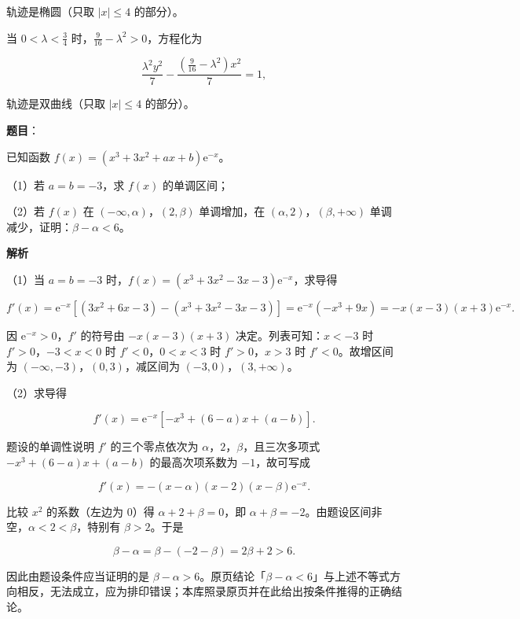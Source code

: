 \begin{answer}
轨迹是椭圆（只取 $|x|\leqslant4$ 的部分）。

当 $0<\lambda<\frac34$ 时，$\frac9{16}-\lambda^2>0$，方程化为

\nopagebreak[4]
\[\frac{\lambda^2y^2}{7}-\frac{\left(\frac9{16}-\lambda^2\right)x^2}{7}=1,\]

轨迹是双曲线（只取 $|x|\leqslant4$ 的部分）。


\end{answer}
\begin{answer}

\textbf{题目}：

已知函数 $f(x)=(x^3+3x^2+ax+b)\mathrm e^{-x}$。

（1）若 $a=b=-3$，求 $f(x)$ 的单调区间；

（2）若 $f(x)$ 在 $(-\infty,\alpha)$，$(2,\beta)$ 单调增加，在 $(\alpha,2)$，$(\beta,+\infty)$ 单调减少，证明：$\beta-\alpha<6$。

\textbf{解析}

（1）当 $a=b=-3$ 时，$f(x)=(x^3+3x^2-3x-3)\mathrm e^{-x}$，求导得

\nopagebreak[4]
\[f'(x)=\mathrm e^{-x}\left[(3x^2+6x-3)-(x^3+3x^2-3x-3)\right]
=\mathrm e^{-x}(-x^3+9x)=-x(x-3)(x+3)\mathrm e^{-x}.\]

因 $\mathrm e^{-x}>0$，$f'$ 的符号由 $-x(x-3)(x+3)$ 决定。列表可知：$x<-3$ 时 $f'>0$，$-3<x<0$ 时 $f'<0$，$0<x<3$ 时 $f'>0$，$x>3$ 时 $f'<0$。故增区间为 $(-\infty,-3)$，$(0,3)$，减区间为 $(-3,0)$，$(3,+\infty)$。

（2）求导得

\nopagebreak[4]
\[f'(x)=\mathrm e^{-x}\left[-x^3+(6-a)x+(a-b)\right].\]

题设的单调性说明 $f'$ 的三个零点依次为 $\alpha$，$2$，$\beta$，且三次多项式 $-x^3+(6-a)x+(a-b)$ 的最高次项系数为 $-1$，故可写成

\nopagebreak[4]
\[f'(x)=-(x-\alpha)(x-2)(x-\beta)\mathrm e^{-x} .\]

比较 $x^2$ 的系数（左边为 $0$）得 $\alpha+2+\beta=0$，即 $\alpha+\beta=-2$。由题设区间非空，$\alpha<2<\beta$，特别有 $\beta>2$。于是

\nopagebreak[4]
\[\beta-\alpha=\beta-(-2-\beta)=2\beta+2>6 .\]

因此由题设条件应当证明的是 $\beta-\alpha>6$。原页结论「$\beta-\alpha<6$」与上述不等式方向相反，无法成立，应为排印错误；本库照录原页并在此给出按条件推得的正确结论。


\end{answer}

